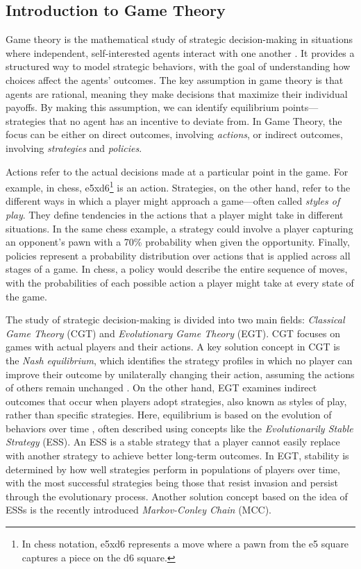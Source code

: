 \subsection{Introduction to Game Theory}

    Game theory is the mathematical study of strategic decision-making in situations where independent, self-interested agents interact with one another \cite{Shoham_Leyton-Brown_2008}. It provides a structured way to model strategic behaviors, with the goal of understanding how choices affect the agents' outcomes. The key assumption in game theory is that agents are rational, meaning they make decisions that maximize their individual payoffs. By making this assumption, we can identify equilibrium points—strategies that no agent has an incentive to deviate from. In Game Theory, the focus can be either on direct outcomes, involving \emph{actions}, or indirect outcomes, involving \emph{strategies} and \emph{policies}.\tinydouble

    \noindent
    Actions refer to the actual decisions made at a particular point in the game. For example, in chess, e5xd6\footnote{In chess notation, e5xd6 represents a move where a pawn from the e5 square captures a piece on the d6 square.} is an action. Strategies, on the other hand, refer to the different ways in which a player might approach a game—often called \emph{styles of play}. They define tendencies in the actions that a player might take in different situations. In the same chess example, a strategy could involve a player capturing an opponent's pawn with a 70\% probability when given the opportunity. Finally, policies represent a probability distribution over actions that is applied across all stages of a game. In chess, a policy would describe the entire sequence of moves, with the probabilities of each possible action a player might take at every state of the game.\tinydouble

    \noindent
    The study of strategic decision-making is divided into two main fields: \emph{Classical Game Theory} (CGT) and \emph{Evolutionary Game Theory} (EGT). CGT focuses on games with actual players and their actions. A key solution concept in CGT is the \emph{Nash equilibrium}, which identifies the strategy profiles in which no player can improve their outcome by unilaterally changing their action, assuming the actions of others remain unchanged \cite{doi:10.1073/pnas.36.1.48}. On the other hand, EGT examines indirect outcomes that occur when players adopt strategies, also known as styles of play, rather than specific strategies. Here, equilibrium is based on the evolution of behaviors over time \cite{Szab__2007}, often described using concepts like the \emph{Evolutionarily Stable Strategy} (ESS). An ESS is a stable strategy that a player cannot easily replace with another strategy to achieve better long-term outcomes. In EGT, stability is determined by how well strategies perform in populations of players over time, with the most successful strategies being those that resist invasion and persist through the evolutionary process. Another solution concept based on the idea of ESSs is the recently introduced \emph{Markov-Conley Chain} (MCC).\tinydouble

